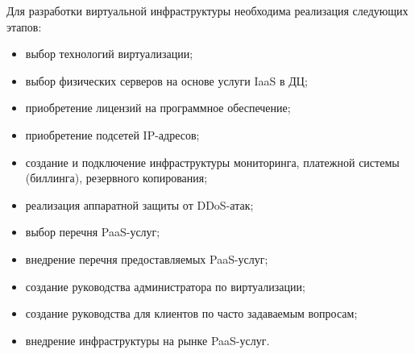 Для разработки виртуальной инфраструктуры необходима реализация следующих этапов:
\begin{itemize}
    \item выбор технологий виртуализации;
    \item выбор физических серверов на основе услуги IaaS в ДЦ;
    \item приобретение лицензий на программное обеспечение;
    \item приобретение подсетей IP-адресов;
    \item создание и подключение инфраструктуры мониторинга, платежной системы (биллинга), резервного копирования;
    \item реализация аппаратной защиты от DDoS-атак;
    \item выбор перечня PaaS-услуг;
    \item внедрение перечня предоставляемых PaaS-услуг;
    \item создание руководства администратора по виртуализации;
    \item создание руководства для клиентов по часто задаваемым вопросам;
    \item внедрение инфраструктуры на рынке PaaS-услуг.
\end{itemize}

\clearpage
